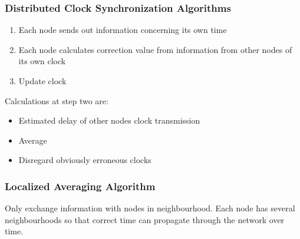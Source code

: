 \documentclass[a4paper]{article}
\begin{document}
\subsubsection{Distributed Clock Synchronization Algorithms}
\begin{enumerate}
		\item Each node sends out information concerning its own time
		\item Each node calculates correction value from information from other
				nodes of its own clock
		\item Update clock
\end{enumerate}
Calculations at step two are:
\begin{itemize}
		\item Estimated delay of other nodes clock transmission
		\item Average
		\item Disregard obviously erroneous clocks
\end{itemize}

\subsubsection{Localized Averaging Algorithm}
Only exchange information with nodes in neighbourhood. Each node has several
neighbourhoods so that correct time can propagate through the network over time.
\end{document}
